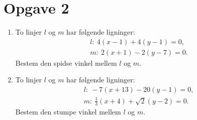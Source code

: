 \section*{Opgave 2}

\begin{enumerate}[label=\roman*)]
	\item To linjer $l$ og $m$ har følgende ligninger:
	\begin{align*}
		&l: \	4(x-1) + 4(y-1) =0,\\
		&m: \ 2(x+1) -2(y-7) = 0.
	\end{align*}	 
	Bestem den spidse vinkel mellem $l$ og $m$. 
	\item To linjer $l$ og $m$ har følgende ligninger:
	\begin{align*}
		&l: \ -7(x+13) - 20(y-1) = 0,\\
		&m: \ \frac{1}{3}(x+4) + \sqrt{2}(y-2) = 0.
	\end{align*}
	Bestem den stumpe vinkel mellem $l$ og $m$. 
\end{enumerate}



